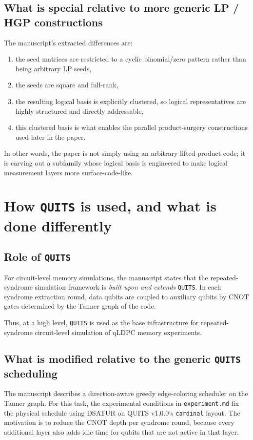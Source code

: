 \documentclass[11pt]{article}
\begin{document}
\subsection{What is special relative to more generic LP / HGP constructions}
The manuscript's extracted differences are:
\begin{enumerate}[label=(\alph*)]
    \item the seed matrices are restricted to a cyclic binomial/zero pattern rather than being arbitrary LP seeds,
    \item the seeds are square and full-rank,
    \item the resulting logical basis is explicitly clustered, so logical representatives are highly structured and directly addressable,
    \item this clustered basis is what enables the parallel product-surgery constructions used later in the paper.
\end{enumerate}
In other words, the paper is not simply using an arbitrary lifted-product code; it is carving out a subfamily whose logical basis is engineered to make logical measurement layers more surface-code-like.

\section{How \texttt{QUITS} is used, and what is done differently}

\subsection{Role of \texttt{QUITS}}
For circuit-level memory simulations, the manuscript states that the repeated-syndrome simulation framework is \emph{built upon and extends} \texttt{QUITS}. In each syndrome extraction round, data qubits are coupled to auxiliary qubits by CNOT gates determined by the Tanner graph of the code.

Thus, at a high level, \texttt{QUITS} is used as the base infrastructure for repeated-syndrome circuit-level simulation of qLDPC memory experiments.

\subsection{What is modified relative to the generic \texttt{QUITS} scheduling}
The manuscript describes a direction-aware greedy edge-coloring scheduler on the Tanner graph. For this task, the experimental conditions in \texttt{experiment.md} fix the physical schedule using DSATUR on QUITS v1.0.0's \texttt{cardinal} layout. The motivation is to reduce the CNOT depth per syndrome round, because every additional layer also adds idle time for qubits that are not active in that layer.
\end{document}
